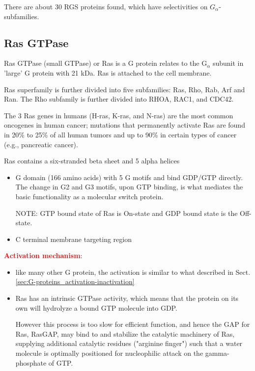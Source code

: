 There are about 30 RGS proteins found, which have selectivities on
$G_\alpha$-subfamilies.


\subsection{Ras GTPase}
\label{sec:Ras-GTPase}

Ras GTPase (small GTPase) or Ras is a G protein relates to the G$_\alpha$
subunit in 'large' G protein with 21 kDa.
Ras is attached to the cell membrane.

Ras superfamily is further divided into five subfamilies: Ras, Rho, Rab, Arf and
Ran. The Rho subfamily is further divided into RHOA, RAC1, and CDC42.	

The 3 Ras genes in humans (H-ras, K-ras, and N-ras) are the most common
oncogenes in human cancer; mutations that permanently activate Ras are found in
20\% to 25\% of all human tumors and up to 90\% in certain types of cancer
(e.g., pancreatic cancer).

Ras contains a six-stranded beta sheet and 5 alpha helices
\begin{itemize}
  \item G domain (166 amino acids) with 5 G motifs and bind GDP/GTP directly.
  The change in G2 and G3 motifs, upon GTP binding, is what mediates the basic
  functionality as a molecular switch protein.
  
  NOTE:  GTP bound state of Ras is On-state and GDP bound state is the
  Off-state.
  
  
  \item C terminal membrane targeting region  
\end{itemize}

\textcolor{red}{\bf Activation mechanism}: 
\begin{itemize}
  \item like many other G protein, the activation is similar to what described
  in Sect.\ref{sec:G-proteins_activation-inactivation}
  
  \item Ras has an intrinsic GTPase activity, which means that the protein on
  its own will hydrolyze a bound GTP molecule into GDP.
  
  However this process is too slow for efficient function, and hence the GAP for
  Ras, RasGAP, may bind to and stabilize the catalytic machinery of Ras,
  supplying additional catalytic residues ("arginine finger") such that a water
  molecule is optimally positioned for nucleophilic attack on the
  gamma-phosphate of GTP.
   
\end{itemize}


